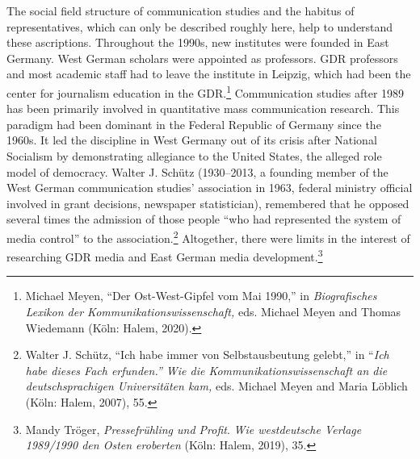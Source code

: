 \documentclass{tufte-handout}
\begin{document}
The social field structure of\setcounter{footnote}{32} communication studies and the habitus of
representatives, which can only be described roughly here, help to
understand these ascriptions. Throughout the 1990s, new institutes were
founded in East Germany. West German scholars were appointed as
professors. GDR professors and most academic staff had to leave the
institute in Leipzig, which had been the center for journalism education
in the GDR.\footnote{Michael Meyen, ``Der Ost-West-Gipfel vom Mai 1990,'' in
  \emph{Biografisches Lexikon der Kommunikationswissenschaft,} eds.
  Michael Meyen and Thomas Wiedemann (Köln: Halem, 2020).
} Communication studies
after 1989 has been primarily involved in quantitative mass
communication research. This paradigm had been dominant in the Federal
Republic of Germany since the 1960s. It led the discipline in West
Germany out of its crisis after National Socialism by demonstrating
allegiance to the United States, the alleged role model of democracy.
Walter J. Schütz (1930--2013, a founding member of the West German
communication studies' association in 1963, federal ministry official
involved in grant decisions, newspaper statistician), remembered that he
opposed several times the admission of those people ``who had
represented the system of media control'' to the
association.\footnote{Walter J. Schütz, ``Ich habe immer von Selbstausbeutung gelebt,'' in
  ``\emph{Ich habe dieses Fach erfunden.'' Wie die
  Kommunikationswissenschaft an die deutschsprachigen Universitäten
  kam,} eds. Michael Meyen and Maria Löblich (Köln: Halem, 2007), 55.
} Altogether, there
were limits in the interest of researching GDR media and East German
media development.\footnote{ Mandy Tröger, \emph{Pressefrühling und Profit}. \emph{Wie westdeutsche
  Verlage 1989/1990 den Osten eroberten} (Köln: Halem, 2019), 35.}
\end{document}
